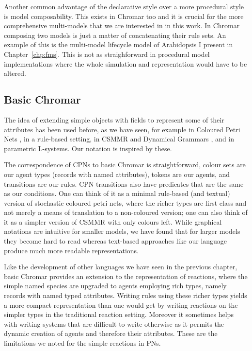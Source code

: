 Another common advantage of the declarative style over a more procedural style
is model composability. This exists in Chromar too and it is crucial for the
more comprehensive multi-models that we are interested in in this work. In
Chromar composing two models is just a matter of concatenating their rule
sets. An example of this is the multi-model lifecycle model of Arabidopsis I
present in Chapter~\ref{chp:fms}. This is not as straighforward in procedural
model implementations where the whole simulation and representation would have
to be altered.


\subsection{Basic Chromar}
The idea of extending simple objects with fields to represent some of their
attributes has been used before, as we have seen, for example in Coloured Petri
Nets \citep{jensen_coloured_1987}, in a rule-based setting, in CSMMR
\citep{oury_coloured_2011} and Dynamical Grammars \citep{mjolsness2006stochastic},
and in parametric L-systems. Our notation is inspired by these.

The correspondence of CPNs to basic Chromar is straightforward, colour sets are
our agent types (records with named attributes), tokens are our agents, and
transitions are our rules. CPN transitions also have predicates that are the
same as our conditions. One can think of it as a minimal rule-based (and
textual) version of stochastic coloured petri nets, where the richer types are
first class and not merely a means of translation to a non-coloured version; one
can also think of it as a simpler version of CSMMR with only colours left. While
graphical notations are intuitive for smaller models, we have found that for
larger models they become hard to read whereas text-based approaches like our
language produce much more readable representations.

Like the development of other languages we have seen in the previous chapter,
basic Chromar provides an extension to the representation of reactions, where
the simple named species are upgraded to agents employing rich types, namely
records with named typed attributes. Writing rules using these richer types
yields a more compact representation than one would get by writing reactions on
the simpler types in the traditional reaction setting. Moreover it sometimes
helps with writing systems that are difficult to write otherwise as it permits
the dynamic creation of agents and therefore their attributes. These are the
limitations we noted for the simple reactions in PNs.

